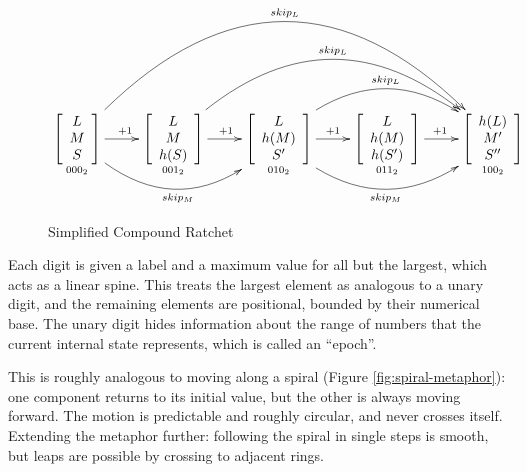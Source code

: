 \documentclass{article}
\begin{document}
	\begin{figure}[h]
		\centering
		
		$\xymatrix{
		    \underset{000_{2}}{\left[ { \begin{array}{cc} L \\ M  \\ S \end{array} } \right]}
				\ar[r]^{+1}
				\ar@/_3pc/[rr]_{skip_{M}}
				\ar@/^7pc/[rrrr]^{skip_{L}}
    	 & \underset{001_{2}}{\left[ { \begin{array}{cc} L \\ M  \\ h(S) \end{array} } \right]}
	      		\ar[r]^{+1}
	      		\ar@/^4.75pc/[rrr]^{skip_{L}}
	     & \underset{010_{2}}{\left[ { \begin{array}{cc} L \\ h(M)  \\ S' \end{array} } \right]}
	      		\ar[r]^{+1}
	      		\ar@/_3pc/[rr]_{skip_{M}}
	      		\ar@/^3pc/[rr]^{skip_{L}}
    	 & \underset{011_{2}}{\left[ { \begin{array}{cc} L \\ h(M)  \\ h(S') \end{array} } \right]}
	      		\ar[r]^{+1}
	     & \underset{100_{2}}{\left[ { \begin{array}{cc} h(L) \\ M'  \\ S'' \end{array} } \right]}
		}$

		\caption{Simplified Compound Ratchet}
		\label{fig:compound-ratchet}
	\end{figure}

	Each digit is given a label and a maximum value for all but the largest, which acts as a linear spine. This treats the largest element as analogous to a unary digit, and the remaining elements are positional, bounded by their numerical base. The unary digit hides information about the range of numbers that the current internal state represents, which is called an ``epoch''.
	
	This is roughly analogous to moving along a spiral (Figure \ref{fig:spiral-metaphor}): one component returns to its initial value, but the other is always moving forward. The motion is predictable and roughly circular, and never crosses itself. Extending the metaphor further: following the spiral in single steps is smooth, but leaps are possible by crossing to adjacent rings.
	
\end{document}
